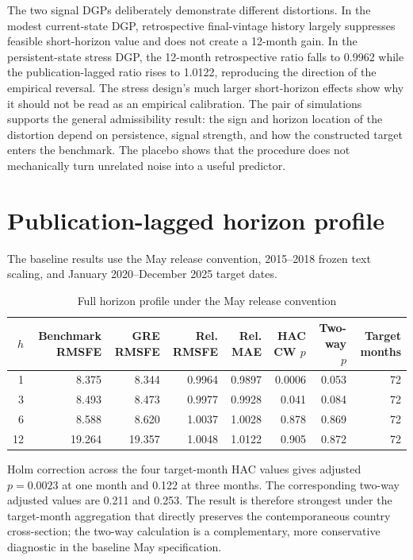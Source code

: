 \documentclass[preprint,12pt,authoryear]{elsarticle}
\begin{document}
The two signal DGPs deliberately demonstrate different distortions. In the modest current-state DGP, retrospective final-vintage history largely suppresses feasible short-horizon value and does not create a 12-month gain. In the persistent-state stress DGP, the 12-month retrospective ratio falls to 0.9962 while the publication-lagged ratio rises to 1.0122, reproducing the direction of the empirical reversal. The stress design's much larger short-horizon effects show why it should not be read as an empirical calibration. The pair of simulations supports the general admissibility result: the sign and horizon location of the distortion depend on persistence, signal strength, and how the constructed target enters the benchmark. The placebo shows that the procedure does not mechanically turn unrelated noise into a useful predictor.

\section{Publication-lagged horizon profile}
The baseline results use the May release convention, 2015--2018 frozen text scaling, and January 2020--December 2025 target dates.
\begin{table}[htbp]
\centering\scriptsize
\caption{Full horizon profile under the May release convention}
\begin{tabular}{rrrrrrrr}
\toprule
$h$ & Benchmark RMSFE & GRE RMSFE & Rel. RMSFE & Rel. MAE & HAC CW $p$ & Two-way $p$ & Target months\\
\midrule
1 & 8.375 & 8.344 & 0.9964 & 0.9897 & 0.0006 & 0.053 & 72\\
3 & 8.493 & 8.473 & 0.9977 & 0.9928 & 0.041 & 0.084 & 72\\
6 & 8.588 & 8.620 & 1.0037 & 1.0028 & 0.878 & 0.869 & 72\\
12 & 19.264 & 19.357 & 1.0048 & 1.0122 & 0.905 & 0.872 & 72\\
\bottomrule
\end{tabular}
\end{table}

Holm correction across the four target-month HAC values gives adjusted $p=0.0023$ at one month and 0.122 at three months. The corresponding two-way adjusted values are 0.211 and 0.253. The result is therefore strongest under the target-month aggregation that directly preserves the contemporaneous country cross-section; the two-way calculation is a complementary, more conservative diagnostic in the baseline May specification.
\end{document}
